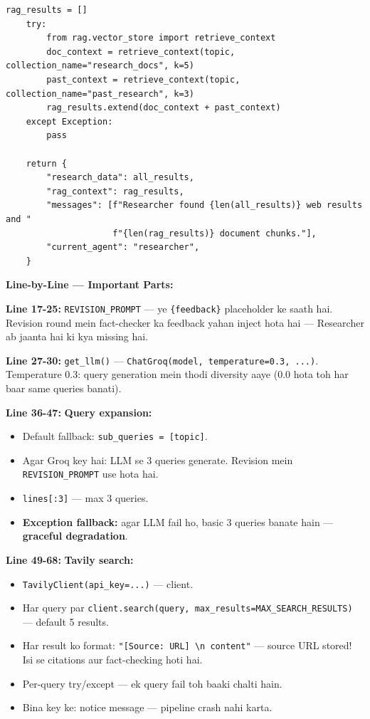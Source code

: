 \documentclass[11pt, a4paper]{article}
\begin{document}
\begin{lstlisting}[style=pythonstyle, caption={agents/researcher.py --- Poora Code}]
    rag_results = []
    try:
        from rag.vector_store import retrieve_context
        doc_context = retrieve_context(topic, collection_name="research_docs", k=5)
        past_context = retrieve_context(topic, collection_name="past_research", k=3)
        rag_results.extend(doc_context + past_context)
    except Exception:
        pass

    return {
        "research_data": all_results,
        "rag_context": rag_results,
        "messages": [f"Researcher found {len(all_results)} web results and "
                     f"{len(rag_results)} document chunks."],
        "current_agent": "researcher",
    }
\end{lstlisting}

\begin{codestorybox}
\textbf{Line-by-Line --- Important Parts:}

\textbf{Line 17-25:} \texttt{REVISION\_PROMPT} --- ye \texttt{\{feedback\}} placeholder ke saath hai. Revision round mein fact-checker ka feedback yahan inject hota hai --- Researcher ab jaanta hai ki kya missing hai.

\textbf{Line 27-30:} \texttt{get\_llm()} --- \texttt{ChatGroq(model, temperature=0.3, ...)}. Temperature 0.3: query generation mein thodi diversity aaye (0.0 hota toh har baar same queries banati).

\textbf{Line 36-47:} \textbf{Query expansion:}
\begin{itemize}
\item Default fallback: \texttt{sub\_queries = [topic]}.
\item Agar Groq key hai: LLM se 3 queries generate. Revision mein \texttt{REVISION\_PROMPT} use hota hai.
\item \texttt{lines[:3]} --- max 3 queries.
\item \textbf{Exception fallback:} agar LLM fail ho, basic 3 queries banate hain --- \textbf{graceful degradation}.
\end{itemize}

\textbf{Line 49-68:} \textbf{Tavily search:}
\begin{itemize}
\item \texttt{TavilyClient(api\_key=...)} --- client.
\item Har query par \texttt{client.search(query, max\_results=MAX\_SEARCH\_RESULTS)} --- default 5 results.
\item Har result ko format: \texttt{"[Source: URL] \textbackslash n content"} --- source URL stored! Isi se citations aur fact-checking hoti hai.
\item Per-query try/except --- ek query fail toh baaki chalti hain.
\item Bina key ke: notice message --- pipeline crash nahi karta.
\end{itemize}


\end{codestorybox}
\end{document}
